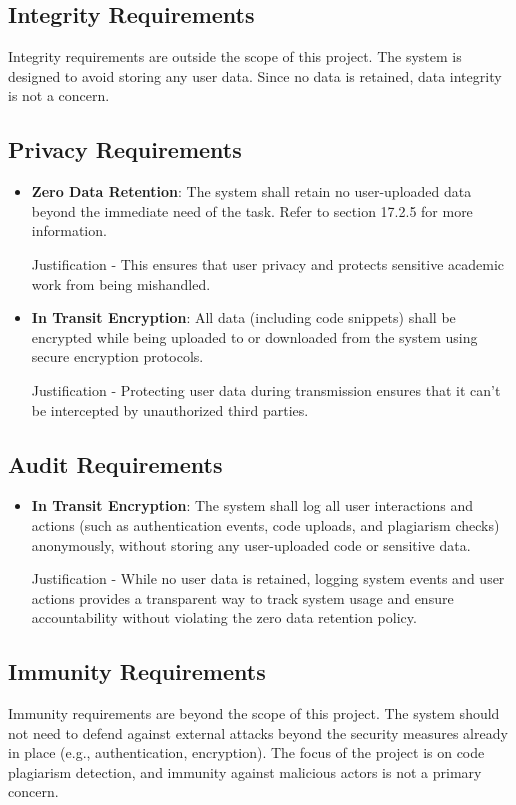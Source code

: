 \documentclass[12pt]{article}
\begin{document}
\subsection{Integrity Requirements}
Integrity requirements are outside the scope of this project. The system is designed to avoid storing any user data.
Since no data is retained, data integrity is not a concern.

\subsection{Privacy Requirements}
\begin{itemize}
    \item \textbf{Zero Data Retention}: The system shall retain no user-uploaded data beyond the immediate need of the task.
    Refer to section 17.2.5 for more information.

    Justification - This ensures that user privacy and protects sensitive academic work from being mishandled.

    \item \textbf{In Transit Encryption}: All data (including code snippets) shall be encrypted while being uploaded to or downloaded
    from the system using secure encryption protocols.

    Justification - Protecting user data during transmission ensures that it can't be intercepted by unauthorized third parties.
\end{itemize}

\subsection{Audit Requirements}
\begin{itemize}
    \item \textbf{In Transit Encryption}: The system shall log all user interactions and actions (such as authentication events, code uploads, and plagiarism checks) anonymously, without storing any user-uploaded code or sensitive data.

    Justification - While no user data is retained, logging system events and user actions provides a transparent way to track system usage and ensure accountability without violating the zero data retention policy.
\end{itemize}

\subsection{Immunity Requirements}
Immunity requirements are beyond the scope of this project. The system should not need to defend against external attacks
beyond the security measures already in place (e.g., authentication, encryption).
The focus of the project is on code plagiarism detection, and immunity against malicious actors is not a primary concern.
\end{document}

